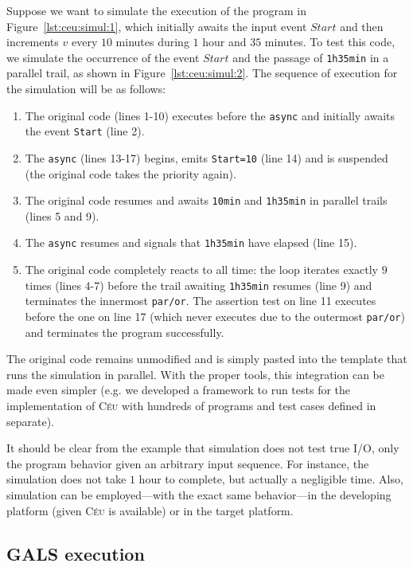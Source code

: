 \documentclass{sigplan-proc}
\newcommand{\2}{\;\;}
\newcommand{\5}{\;\;\;\;\;}
\newcommand{\CEU}{\textsc{C\'{e}u}}
\newcommand{\code}[1] {{\small{\texttt{#1}}}}
\begin{document}
Suppose we want to simulate the execution of the program in 
Figure~\ref{lst:ceu:simul:1}, which initially awaits the input event $Start$ 
and then increments $v$ every $10$ minutes during $1$ hour and $35$ minutes.
To test this code, we simulate the occurrence of the event $Start$ and the 
passage of \code{1h35min} in a parallel trail, as shown in 
Figure~\ref{lst:ceu:simul:2}.
The sequence of execution for the simulation will be as follows:

{\small
\begin{enumerate}
\setlength{\itemsep}{0pt}
\item The original code (lines 1-10) executes before the \code{async} and 
initially awaits the event \code{Start} (line 2).
\item The \code{async} (lines 13-17) begins, emits \code{Start=10} (line 14) 
and is suspended (the original code takes the priority again).
\item The original code resumes and awaits \code{10min} and \code{1h35min} in 
parallel trails (lines 5 and 9).
\item The \code{async} resumes and signals that \code{1h35min} have elapsed 
(line 15).
\item The original code completely reacts to all time: the loop iterates 
exactly $9$ times (lines 4-7) before the trail awaiting \code{1h35min} resumes 
(line 9) and terminates the innermost \code{par/or}.
The assertion test on line 11 executes before the one on line 17 (which never 
executes due to the outermost \code{par/or}) and terminates the program 
successfully.
\end{enumerate}
}

The original code remains unmodified and is simply pasted into the template 
that runs the simulation in parallel.
With the proper tools, this integration can be made even simpler (e.g. we 
developed a framework to run tests for the implementation of \CEU{} with 
hundreds of programs and test cases defined in separate).

It should be clear from the example that simulation does not test true I/O, 
only the program behavior given an arbitrary input sequence.
For instance, the simulation does not take $1$ hour to complete, but actually a 
negligible time.
Also, simulation can be employed---with the exact same behavior---in the 
developing platform (given \CEU{} is available) or in the target platform.

\subsection{GALS execution}
\label{sec:ceu:gals}
\end{document}
